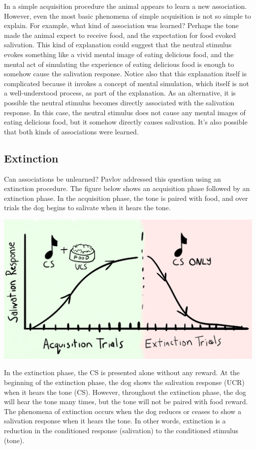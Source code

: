 \documentclass[
  oneside,
  12pt]{crumpbook}
\begin{document}
In a simple acquisition procedure the animal appears to learn a new association. However, even the most basic phenomena of simple acquisition is not so simple to explain. For example, what kind of association was learned? Perhaps the tone made the animal expect to receive food, and the expectation for food evoked salivation. This kind of explanation could suggest that the neutral stimulus evokes something like a vivid mental image of eating delicious food, and the mental act of simulating the experience of eating delicious food is enough to somehow cause the salivation response. Notice also that this explanation itself is complicated because it invokes a concept of mental simulation, which itself is not a well-understood process, as part of the explanation. As an alternative, it is possible the neutral stimulus becomes directly associated with the salivation response. In this case, the neutral stimulus does not cause any mental images of eating delicious food, but it somehow directly causes salivation. It's also possible that both kinds of associations were learned.

\hypertarget{extinction}{%
\subsection{Extinction}\label{extinction}}

Can associations be unlearned? Pavlov addressed this question using an extinction procedure. The figure below shows an acquisition phase followed by an extinction phase. In the acquisition phase, the tone is paired with food, and over trials the dog begins to salivate when it hears the tone.

\includegraphics[width=1\linewidth]{imgs/Conditioning_extinction}

In the extinction phase, the CS is presented alone without any reward. At the beginning of the extinction phase, the dog shows the salivation response (UCR) when it hears the tone (CS). However, throughout the extinction phase, the dog will hear the tone many times, but the tone will not be paired with food reward. The phenomena of extinction occurs when the dog reduces or ceases to show a salivation response when it hears the tone. In other words, extinction is a reduction in the conditioned response (salivation) to the conditioned stimulus (tone).
\end{document}
